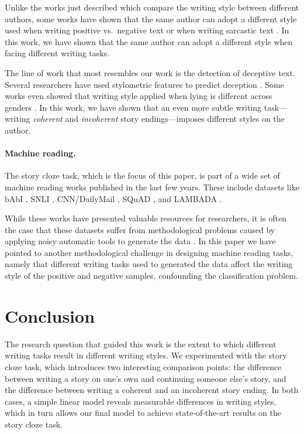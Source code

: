 \documentclass[11pt,a4paper]{article}
\newcommand{\isectionb}[1]{\section{#1}\label{ssec:#1}}
\newcommand{\resolved}[1]{}
\newcommand{\roy}[1]{{\color{orange}\textsc{[#1 --rs]}}}
\newcommand{\nascomment}[1]{{\color{blue}\textsc{[#1 --nas]}}}
\renewcommand{\roy}[1]{}
\begin{document}
Unlike the works just described which compare the writing style
between different authors, some works have shown that the same author
can adopt a different style used when writing positive vs.~negative
text \cite{Davidov:2010} or when writing sarcastic text \cite{Tsur:2010}. In this work, we have shown that the same author can adopt a different style when facing different writing tasks.

The line of work that most resembles our work is the detection of deceptive text. 
Several researchers have used stylometric features to  predict deception 
\cite{Newman:2003,hancock2007lying,ott2011finding,Feng:2012}.
Some works even showed that writing style applied when lying is different across genders \cite{Perez:2014a,Perez:2014b}.
In this work, we have shown that an even more subtle writing task---writing {\it coherent} and {\it incoherent} story endings---imposes different styles on the author.


\paragraph{Machine reading.}
The  story cloze task, which is the focus of this paper, is part of a wide set of machine reading works published in the last few years.
These include datasets like bAbI \cite{Weston:2015}, SNLI \cite{bowman2015large}, CNN/DailyMail \cite{hermann2015teaching}, SQuAD \cite{rajpurkar2016squad}, and LAMBADA \cite{Paperno:2016}. 

While these works have presented valuable resources for researchers, 
it is often the case that these datasets suffer from methodological
problems caused by applying noisy automatic tools to generate the data\resolved{ \nascomment{this is not clear to me, what does it mean?} when generating the datasets} \roy{better?}\cite{Chen:2016}. 
In this paper we have pointed to another methodological challenge in
designing machine reading tasks, namely that different writing tasks
used to generated the data affect the writing style of the positive
and negative samples, confounding the classification problem.
 \resolved{\nascomment{dropped the train/test discrepancy here}}

\isectionb{Conclusion}

The research question that guided this work is the extent to which different writing tasks result in different writing styles.
We experimented with the story cloze task, which introduces two interesting comparison points: %
 the difference between writing a story on one's own and continuing someone else's story,
 and the difference between writing a coherent and an incoherent story ending.
In both cases, a simple linear model reveals measurable differences in writing styles, %
which in turn allows our final 
model to achieve state-of-the-art results on the story cloze task.
\end{document}
